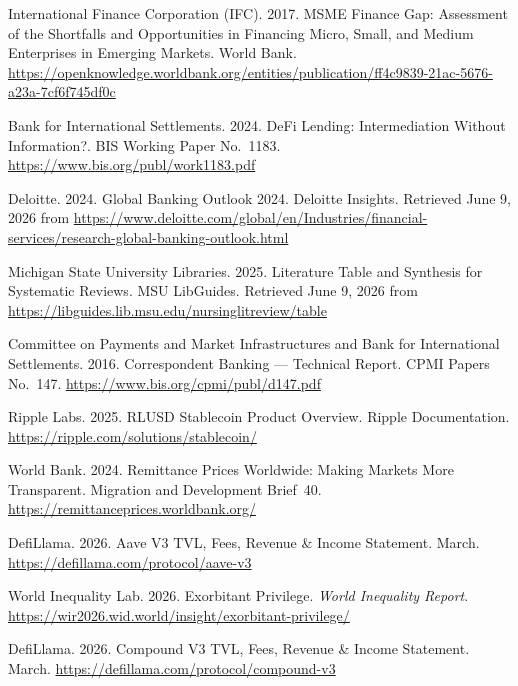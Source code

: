 \documentclass[12pt, a4paper]{report}
\begin{document}
{\begin{enumerate}[label={[\arabic*]}]
\item International Finance Corporation (IFC). 2017. MSME Finance Gap: Assessment of the Shortfalls and Opportunities in Financing Micro, Small, and Medium Enterprises in Emerging Markets. World Bank. \url{https://openknowledge.worldbank.org/entities/publication/ff4c9839-21ac-5676-a23a-7cf6f745df0c}

\item Bank for International Settlements. 2024. DeFi Lending: Intermediation Without Information?. BIS Working Paper No.~1183. \url{https://www.bis.org/publ/work1183.pdf}

\item Deloitte. 2024. Global Banking Outlook 2024. Deloitte Insights. Retrieved June 9, 2026 from \url{https://www.deloitte.com/global/en/Industries/financial-services/research-global-banking-outlook.html}

\item Michigan State University Libraries. 2025. Literature Table and Synthesis for Systematic Reviews. MSU LibGuides. Retrieved June 9, 2026 from \url{https://libguides.lib.msu.edu/nursinglitreview/table}

\item Committee on Payments and Market Infrastructures and Bank for International Settlements. 2016. Correspondent Banking --- Technical Report. CPMI Papers No.~147. \url{https://www.bis.org/cpmi/publ/d147.pdf}

\item Ripple Labs. 2025. RLUSD Stablecoin Product Overview. Ripple Documentation. \url{https://ripple.com/solutions/stablecoin/}

\item World Bank. 2024. Remittance Prices Worldwide: Making Markets More Transparent. Migration and Development Brief~40. \url{https://remittanceprices.worldbank.org/}

\item DefiLlama. 2026. Aave V3 TVL, Fees, Revenue \& Income Statement. March. \url{https://defillama.com/protocol/aave-v3}

\item World Inequality Lab. 2026. Exorbitant Privilege. \emph{World Inequality Report}. \url{https://wir2026.wid.world/insight/exorbitant-privilege/}

\item DefiLlama. 2026. Compound V3 TVL, Fees, Revenue \& Income Statement. March. \url{https://defillama.com/protocol/compound-v3}


\end{enumerate}}
\end{document}
